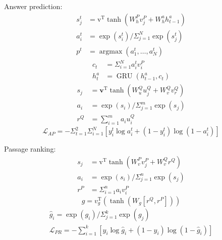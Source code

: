 \documentclass[a4paper,UTF8]{article}
\numberwithin{equation}{section}
\begin{document}
Answer prediction:
\begin{equation}
\begin{aligned} s_{j}^{t} &=\mathrm{v}^{\mathrm{T}} \tanh \left(W_{h}^{P} v_{j}^{P}+W_{h}^{a} h_{t-1}^{a}\right) \\ a_{i}^{t} &=\exp \left(s_{i}^{t}\right) / \Sigma_{j=1}^{N} \exp \left(s_{j}^{t}\right) \\ p^{t} &=\operatorname{argmax}\left(a_{1}^{t}, \ldots, a_{N}^{t}\right) \end{aligned}
\end{equation}
\begin{equation}
\begin{aligned} c_{t} &=\Sigma_{i=1}^{N} a_{i}^{t} v_{i}^{P} \\ h_{t}^{a} &=\operatorname{GRU}\left(h_{t-1}^{a}, c_{t}\right) \end{aligned}
\end{equation}
\begin{equation}
\begin{aligned} s_{j} &=\mathbf{v}^{\mathrm{T}} \tanh \left(W_{u}^{Q} u_{j}^{Q}+W_{v}^{Q} v_{r}^{Q}\right) \\ a_{i} &=\exp \left(s_{i}\right) / \Sigma_{j=1}^{m} \exp \left(s_{j}\right) \\ r^{Q} &=\sum_{i=1}^{m} a_{i} u_{i}^{Q} \end{aligned}
\end{equation}
\begin{equation}
	\mathcal{L}_{A P}=-\Sigma_{t=1}^{2} \Sigma_{i=1}^{N}\left[y_{i}^{t} \log a_{i}^{t}+\left(1-y_{i}^{t}\right) \log \left(1-a_{i}^{t}\right)\right]
	\end{equation}

Passage ranking:
\begin{equation}
\begin{aligned} s_{j} &=\mathrm{v}^{\mathrm{T}} \tanh \left(W_{v}^{P} v_{j}^{P}+W_{v}^{Q} r^{Q}\right) \\ a_{i} &=\exp \left(s_{i}\right) / \Sigma_{j=1}^{n} \exp \left(s_{j}\right) \\ r^{P} &=\Sigma_{i=1}^{n} a_{i} v_{i}^{P} \end{aligned}
\end{equation}
\begin{equation}
	g=v_{g}^{\mathrm{T}}\left(\tanh \left(W_{g}\left[r^{Q}, r^{P}\right]\right)\right)
	\end{equation}
	\begin{equation}
	\begin{array}{c}{\hat{g}_{i}=\exp \left(g_{i}\right) / \Sigma_{j=1}^{k} \exp \left(g_{j}\right)} \\ {\mathcal{L}_{P R}=-\sum_{i=1}^{k}\left[y_{i} \log \hat{g}_{i}+\left(1-y_{i}\right) \log \left(1-\hat{g}_{i}\right)\right]}\end{array}
	\end{equation}
\end{document}
